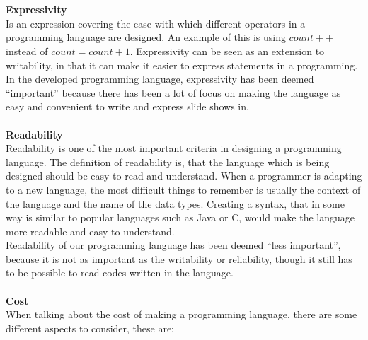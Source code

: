 \\ \\
\textbf{Expressivity} \\
Is an expression covering the ease with which different operators in a programming language are designed. An example of this is using $count++$ instead of $count = count + 1$. Expressivity can
be seen as an extension to writability, in that it can make it easier to express statements in a programming. In the developed programming language, expressivity has been deemed ``important'' because there has been a lot of focus on making the language as easy and convenient to write and express slide shows in.
\\ \\
\textbf{Readability} \\
Readability is one of the most important criteria in designing a programming language. The definition of readability is, that the language which is being designed should be easy to read and understand. When a programmer is adapting to a new language, the most difficult things to remember is usually the context of the language and the name of the data types. Creating a syntax, that in some way is similar to popular languages such as Java or C, would make the language more readable and easy to understand. \\
Readability of our programming language has been deemed ``less important'', because it is not as important as the writability or reliability, though it still has to be possible to read codes written in the language.
\\ \\
\textbf{Cost} \\
When talking about the cost of making a programming language, there are some different aspects to consider, these are:
